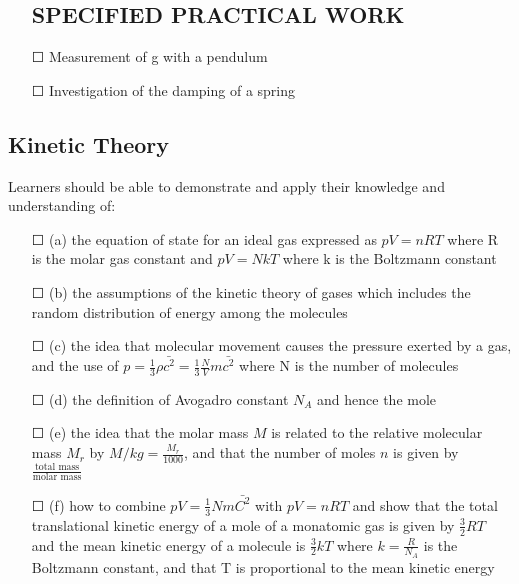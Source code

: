 \begin{itemize}
	\subsection*{SPECIFIED PRACTICAL WORK}
	\item[\Large{$\Square$}] Measurement of g with a pendulum
	\item[\Large{$\Square$}] Investigation of the damping of a spring
\end{itemize}
\subsection{Kinetic Theory}
Learners should be able to demonstrate and apply their knowledge and
understanding of:
\begin{itemize}
	\item[\Large{$\Square$}](a) the equation of state for an ideal gas expressed as $pV = nRT$ where R is the 	molar gas constant and $pV = NkT$ where k is the Boltzmann constant
	\item[\Large{$\Square$}](b) the assumptions of the kinetic theory of gases which includes the random distribution of energy among the molecules
	\item[\Large{$\Square$}]	(c) the idea that molecular movement causes the pressure exerted by a gas, and \sq the use of \(p=\frac{1}{3}\rho \bar{c^{2}} = \frac{1}{3}\frac{N}{V} m\bar{c^{2}}\) where N is the number of molecules
	\item[\Large{$\Square$}]	(d) the definition of Avogadro constant $N_A$ and hence the mole
	\item[\Large{$\Square$}]	(e) the idea that the molar mass $M$ is related to the relative molecular mass $M_r$ by \(M/kg=\frac{M_{r}}{1000}\), and that \sq the number of moles $n$ is given by $	\frac{\text{total mass}}{\text{molar mass}}$
	\item[\Large{$\Square$}]	(f) how to combine \(pV=\frac{1}{3}Nm\bar{C^{2}} \) with \(pV = nRT\) and show that the total translational kinetic energy of a mole of a monatomic gas is given by \(\frac{3}{2}RT\) and \sq the mean kinetic energy of a molecule is \(\frac{3}{2}kT\) where \(k=\frac{R}{N_{A}}\) is the Boltzmann constant, and that T is proportional to the mean kinetic energy
\end{itemize}
